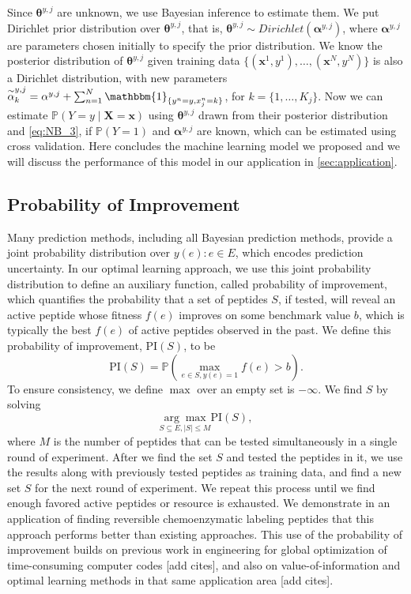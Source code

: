 \documentclass[11pt]{article}
\newcommand{\Prob}{\mathbb{P}}
\newcommand{\PI}{\text{PI}}
\begin{document}
Since $\bm{\theta}^{y, j}$ are unknown, we use Bayesian inference to estimate them. We 
put Dirichlet prior distribution over $\bm{\theta}^{y, j}$, that is,
$\bm{\theta}^{y, j} \sim Dirichlet(\bm{\alpha}^{y, j})$, where $\bm{\alpha}^{y, j}$
are parameters chosen initially to specify the prior distribution. We know the
posterior distribution of $\bm{\theta}^{y, j}$ given training data $\{(\bm{x}^1, y^1), 
\ldots, (\bm{x}^N, y^N)\}$ is also a Dirichlet distribution, with new parameters
$\overset{\sim}{\alpha}^{y, j}_k = \alpha^{y, j} + \sum_{n=1}^N \mathbbm{1}_{\{y^n = y, x^n_j = k\}}$,
for $k = \{1, \ldots, K_j\}$. Now we can estimate $\Prob(Y = y \mid \bm{X} = \bm{x})$
using $\bm{\theta}^{y, j}$ drawn from their posterior distribution and \eqref{eq:NB_3},
if $\Prob(Y = 1)$ and $\bm{\alpha}^{y, j}$ are known, which can be estimated using
cross validation. Here concludes the machine learning model we proposed and we will
discuss the performance of this model in our application in \ref{sec:application}.

\subsection{Probability of Improvement} \label{sec:prob improvement}
Many prediction methods, including all Bayesian prediction methods, provide a joint probability distribution over
$y(e): e \in E$, which encodes prediction uncertainty. 
In our optimal learning approach, we use this joint probability distribution to define an auxiliary function, called probability of improvement, which quantifies the probability that a set of peptides $S$, if tested, will reveal an active peptide whose fitness $f(e)$ improves on some benchmark value $b$, which is typically the best $f(e)$ of active peptides observed in the past. 
We define this probability of improvement, $\PI(S)$, to be
\begin{equation}
  \PI(S) = \Prob \left( \max_{e \in S, y(e)=1} f(e) > b \right).
  \label{}
\end{equation}
To ensure consistency, we define $\max$ over an empty set is $-\infty$. We find $S$ by solving
\begin{equation}
  \underset{S \subseteq E, |S| \leq M}{\arg\max} \PI(S),
  \label{eq:opt PI}
\end{equation}
where $M$ is the number of peptides that can be tested simultaneously in a single round of experiment. 
After we find the set $S$ and tested the peptides in it, we use the results along with previously
tested peptides as training data, and find a new set $S$ for the next round of experiment. We repeat this
process until we find enough favored active peptides or resource is exhausted. We demonstrate
in an application of finding reversible chemoenzymatic labeling peptides
that this approach performs better than existing approaches.
This use of the probability of improvement builds on previous work in engineering 
for global optimization of time-consuming computer codes [add cites], and also on
value-of-information and optimal learning methods in that same application area 
[add cites].
\end{document}
